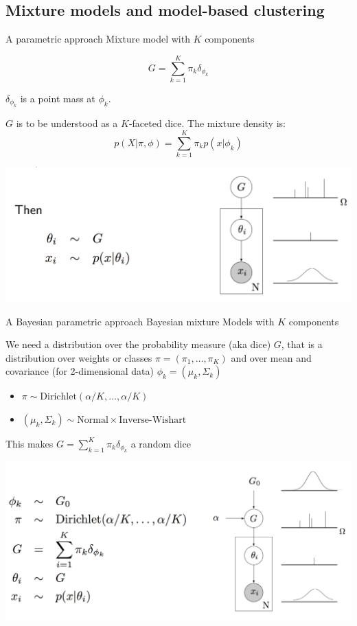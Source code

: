 \subsection[Mixture models]{Mixture models and model-based clustering}

\begin{frame}{A {parametric} approach}
 Mixture model with $K$ components
	
	$$G = \sum_{k=1}^K \pi_k \delta_{\phi_k}$$
	
	$\delta_{\phi_k}$ is a point mass at ${\phi_k}$.
	
	$G$ is to be understood as a $K$-faceted dice. The  mixture density is:
	$$p(X|\pi,\phi) = \sum_{k=1}^K \pi_k p(x|\phi_k)$$
	
\begin{center}
		\includegraphics[width=.8\textwidth]{figures_julyan/mixtures/plate_mixture}
\end{center}
\end{frame}



\begin{frame}{A {Bayesian parametric} approach}
	 \alert{Bayesian}   mixture Models with $K$ components
	
We need a distribution over the probability measure (aka dice) $G$, that is a distribution over weights or classes $\pi = (\pi_1,\ldots,\pi_K)$ and over mean and covariance (for 2-dimensional data) $\phi_k = (\mu_k,\Sigma_k)$

\begin{itemize}
	\item $\pi\sim \text{Dirichlet}(\alpha/K, \ldots,\alpha/K)$
	\item $(\mu_k,\Sigma_k)\sim \text{Normal}\times\text{Inverse-Wishart}$
\end{itemize}
This makes $G = \sum_{k=1}^K \pi_k \delta_{\phi_k}$ a random dice

\begin{center}
		\includegraphics[width=.8\textwidth]{figures_julyan/mixtures/plate_bayes_mixture}
\end{center}
\end{frame}

